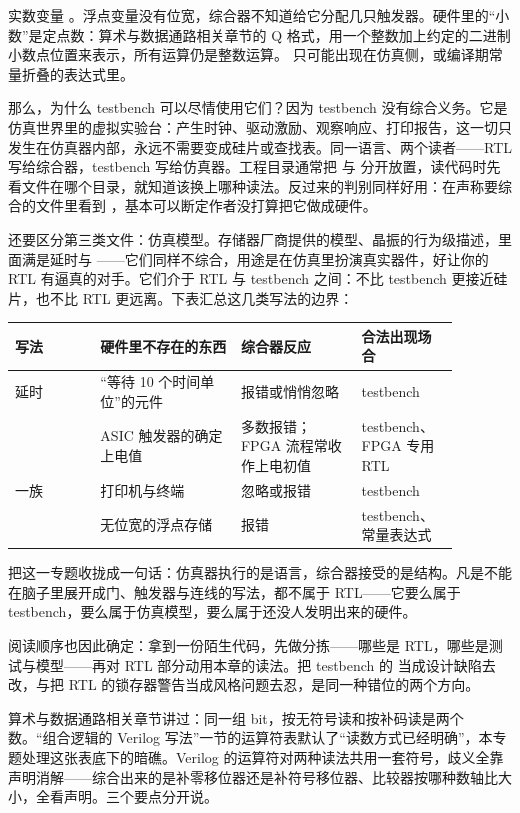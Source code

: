 实数变量 。浮点变量没有位宽，综合器不知道给它分配几只触发器。硬件里的“小数”是定点数：算术与数据通路相关章节的 Q 格式，用一个整数加上约定的二进制小数点位置来表示，所有运算仍是整数运算。 只可能出现在仿真侧，或编译期常量折叠的表达式里。

那么，为什么 testbench 可以尽情使用它们？因为 testbench 没有综合义务。它是仿真世界里的虚拟实验台：产生时钟、驱动激励、观察响应、打印报告，这一切只发生在仿真器内部，永远不需要变成硅片或查找表。同一语言、两个读者——RTL 写给综合器，testbench 写给仿真器。工程目录通常把  与  分开放置，读代码时先看文件在哪个目录，就知道该换上哪种读法。反过来的判别同样好用：在声称要综合的文件里看到 ，基本可以断定作者没打算把它做成硬件。

还要区分第三类文件：仿真模型。存储器厂商提供的模型、晶振的行为级描述，里面满是延时与 ——它们同样不综合，用途是在仿真里扮演真实器件，好让你的 RTL 有逼真的对手。它们介于 RTL 与 testbench 之间：不比 testbench 更接近硅片，也不比 RTL 更远离。下表汇总这几类写法的边界：

\begin{longtable}{L{0.17\linewidth}L{0.29\linewidth}L{0.24\linewidth}L{0.18\linewidth}}
\toprule
写法 & 硬件里不存在的东西 & 综合器反应 & 合法出现场合 \\
\midrule
{} 延时 & “等待 10 个时间单位”的元件 & 报错或悄悄忽略 & testbench \\\tablerowrule
{} & ASIC 触发器的确定上电值 & 多数报错；FPGA 流程常收作上电初值 & testbench、FPGA 专用 RTL \\\tablerowrule
{} 一族 & 打印机与终端 & 忽略或报错 & testbench \\\tablerowrule
{} & 无位宽的浮点存储 & 报错 & testbench、常量表达式 \\
\bottomrule
\end{longtable}

把这一专题收拢成一句话：仿真器执行的是语言，综合器接受的是结构。凡是不能在脑子里展开成门、触发器与连线的写法，都不属于 RTL——它要么属于 testbench，要么属于仿真模型，要么属于还没人发明出来的硬件。

阅读顺序也因此确定：拿到一份陌生代码，先做分拣——哪些是 RTL，哪些是测试与模型——再对 RTL 部分动用本章的读法。把 testbench 的  当成设计缺陷去改，与把 RTL 的锁存器警告当成风格问题去忍，是同一种错位的两个方向。


算术与数据通路相关章节讲过：同一组 bit，按无符号读和按补码读是两个数。“组合逻辑的 Verilog 写法”一节的运算符表默认了“读数方式已经明确”，本专题处理这张表底下的暗礁。Verilog 的运算符对两种读法共用一套符号，歧义全靠声明消解——综合出来的是补零移位器还是补符号移位器、比较器按哪种数轴比大小，全看声明。三个要点分开说。

